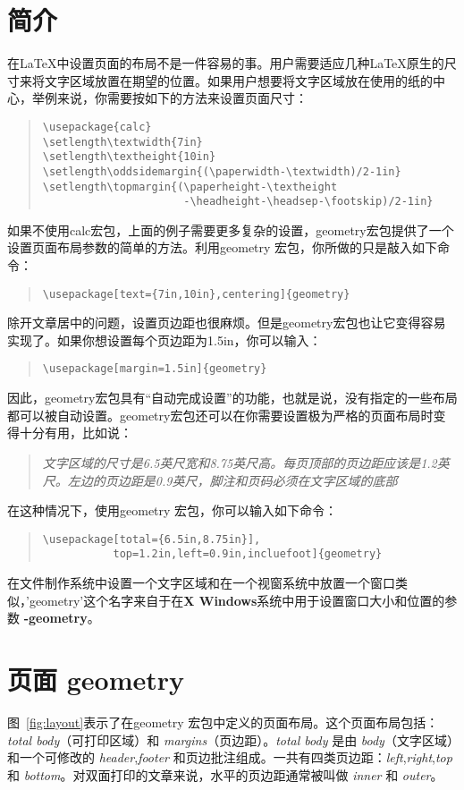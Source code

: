 \documentclass[titlepage]{ctexart}
\def\Gm{\textsf{geometry}}
\newcommand{\gpart}[1]{\textsf{\textsl{\color[rgb]{.0,.45,.7}#1}}}
\begin{document}
\section{简介}
	在\LaTeX{}中设置页面的布局不是一件容易的事。用户需要适应几种\LaTeX{}原生的尺寸来将文字区域放置在期望的位置。如果用户想要将文字区域放在使用的纸的中心，举例来说，你需要按如下的方法来设置页面尺寸：
	\begin{quote}
		\verb|\usepackage{calc}|\\
		\verb|\setlength\textwidth{7in}|\\
		\verb|\setlength\textheight{10in}|\\
		\verb|\setlength\oddsidemargin{(\paperwidth-\textwidth)/2-1in}|\\
		\verb|\setlength\topmargin{(\paperheight-\textheight|\\
		\verb|                      -\headheight-\headsep-\footskip)/2-1in}|
	\end{quote}
	如果不使用calc宏包，上面的例子需要更多复杂的设置，\Gm 宏包提供了一个设置页面布局参数的简单的方法。利用\Gm{} 宏包，你所做的只是敲入如下命令：
	\begin{quote}
		\verb|\usepackage[text={7in,10in},centering]{geometry}|
	\end{quote}
	除开文章居中的问题，设置页边距也很麻烦。但是\Gm 宏包也让它变得容易实现了。如果你想设置每个页边距为1.5in，你可以输入：
	\begin{quote}
		\verb|\usepackage[margin=1.5in]{geometry}|
	\end{quote}
	因此，\Gm 宏包具有“自动完成设置”的功能，也就是说，没有指定的一些布局都可以被自动设置。\Gm 宏包还可以在你需要设置极为严格的页面布局时变得十分有用，比如说：
	\begin{quote}\textsl{
	文字区域的尺寸是6.5英尺宽和8.75英尺高。每页顶部的页边距应该是1.2英尺。左边的页边距是0.9英尺，脚注和页码必须在文字区域的底部
	}\end{quote}
	在这种情况下，使用\Gm{} 宏包，你可以输入如下命令：
	\begin{quote}
		\verb|\usepackage[total={6.5in,8.75in}],|\\
		\verb|           top=1.2in,left=0.9in,incluefoot]{geometry}|
	\end{quote}
	在文件制作系统中设置一个文字区域和在一个视窗系统中放置一个窗口类似，'geometry'这个名字来自于在\textbf{X Windows}系统中用于设置窗口大小和位置的参数 \textbf{-geometry}。
\section{页面 geometry}
	图~\ref{fig:layout}表示了在\Gm{} 宏包中定义的页面布局。这个页面布局包括：
	\gpart{total body}（可打印区域）和 \gpart{margins}（页边距）。\gpart{total body} 是由 \gpart{body}（文字区域）和一个可修改的 \gpart{header},\gpart{footer} 和页边批注组成。一共有四类页边距：\gpart{left},\gpart{right},\gpart{top} 和 \gpart{bottom}。对双面打印的文章来说，水平的页边距通常被叫做 \gpart{inner} 和 \gpart{outer}。
	
\end{document}
